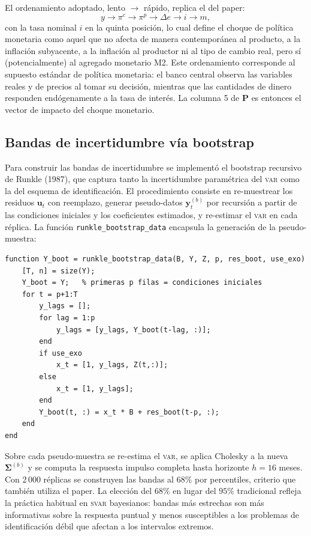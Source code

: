 \documentclass[11pt,letterpaper]{article}
\begin{document}
El ordenamiento adoptado, lento $\to$ rápido, replica el del paper:
\begin{equation}
y \to \pi^c \to \pi^p \to \Delta e \to i \to m,
\label{eq:orden_chol}
\end{equation}
con la tasa nominal $i$ en la quinta posición, lo cual define el choque de política monetaria como aquel que no afecta de manera contemporánea al producto, a la inflación subyacente, a la inflación al productor ni al tipo de cambio real, pero sí (potencialmente) al agregado monetario M2. Este ordenamiento corresponde al supuesto estándar de política monetaria: el banco central observa las variables reales y de precios al tomar su decisión, mientras que las cantidades de dinero responden endógenamente a la tasa de interés. La columna 5 de $\bm{P}$ es entonces el vector de impacto del choque monetario.

\subsection{Bandas de incertidumbre vía bootstrap}

Para construir las bandas de incertidumbre se implementó el bootstrap recursivo de Runkle (1987), que captura tanto la incertidumbre paramétrica del \textsc{var} como la del esquema de identificación. El procedimiento consiste en re-muestrear los residuos $\bm{u}_t$ con reemplazo, generar pseudo-datos $\bm{y}^{(b)}_t$ por recursión a partir de las condiciones iniciales y los coeficientes estimados, y re-estimar el \textsc{var} en cada réplica. La función \texttt{runkle\_bootstrap\_data} encapsula la generación de la pseudo-muestra:

\begin{lstlisting}[style=matlabstyle, caption={Generación de pseudo-datos por recursión}]
function Y_boot = runkle_bootstrap_data(B, Y, Z, p, res_boot, use_exo)
    [T, n] = size(Y);
    Y_boot = Y;   % primeras p filas = condiciones iniciales
    for t = p+1:T
        y_lags = [];
        for lag = 1:p
            y_lags = [y_lags, Y_boot(t-lag, :)];
        end
        if use_exo
            x_t = [1, y_lags, Z(t,:)];
        else
            x_t = [1, y_lags];
        end
        Y_boot(t, :) = x_t * B + res_boot(t-p, :);
    end
end
\end{lstlisting}

Sobre cada pseudo-muestra se re-estima el \textsc{var}, se aplica Cholesky a la nueva $\bm{\Sigma}^{(b)}$ y se computa la respuesta impulso completa hasta horizonte $h=16$ meses. Con 2\,000 réplicas se construyen las bandas al $68\%$ por percentiles, criterio que también utiliza el paper. La elección del $68\%$ en lugar del $95\%$ tradicional refleja la práctica habitual en \textsc{svar} bayesianos: bandas más estrechas son más informativas sobre la respuesta puntual y menos susceptibles a los problemas de identificación débil que afectan a los intervalos extremos.
\end{document}
